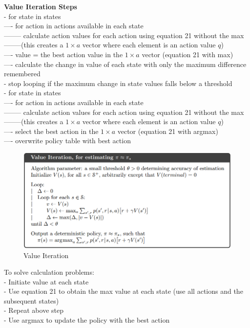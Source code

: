 \documentclass{article}
\begin{document}
\noindent
\textbf{Value Iteration Steps}\\
- for state in states \\
---- for action in actions available in each state \\
-------- calculate action values for each action using equation 21 without the
max\\
--------(this creates a $1 \times a$ vector where each element is an
action value $q$)\\
---- value = the best action value in the $ 1 \times a$ vector (equation 21 with
max)\\
---- calculate the change in value of each state with only the maximum
difference remembered\\
- stop looping if the maximum change in state values falls below a threshold\\
- for state in states\\
---- for action in actions available in each state \\
-------- calculate action values for each action using equation 21 without the
max\\
--------(this creates a $1 \times a$ vector where each element is an
action value $q$)\\
---- select the best action in the $ 1 \times a$ vector (equation 21 with
argmax)\\
---- overwrite policy table with best action

\begin{figure}[h]
\includegraphics[scale=0.4]{value_iteration}
\centering
\caption{Value Iteration}
\end{figure}

\noindent
To solve calculation problems:\\
- Initiate value at each state\\
- Use equation 21 to obtain the max value at each state (use all actions and the
subsequent states)\\
- Repeat above step\\
- Use argmax to update the policy with the best action\\
\end{document}
